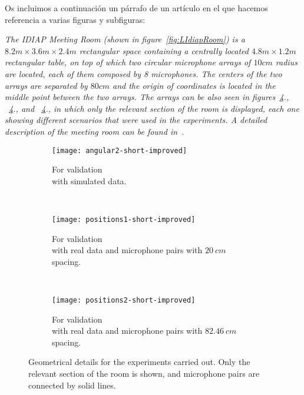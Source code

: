 Os incluimos a continuación un
párrafo de un artículo en el que hacemos referencia a varias figuras y
subfiguras: 

\emph{The IDIAP Meeting Room (shown in figure~\ref{fig:LIdiapRoom}) is a $8.2m
\times 3.6m \times 2.4m$ rectangular space containing a centrally
located $4.8m \times 1.2m$ rectangular table, on top of which two
circular microphone arrays of $10 cm$ radius are located, each of them
composed by 8 microphones. The centers of the two arrays are separated
by $80 cm$ and the origin of coordinates is located in the middle point
between the two arrays. The arrays can be also seen in
figures~\ref{fig:simureal_positions}.,
~\ref{fig:simureal_positions}., and
~\ref{fig:simureal_positions}., in which
only the relevant section of the room is displayed, each one showing
different scenarios that were used in the experiments. A detailed
description of the meeting room can be found in~\cite{moore2002}.}

\begin{figure}
  \centering
  \begin{subfigure}[t]{0.3\textwidth}
    \texttt{[image: angular2-short-improved]}
    \caption{For validation\\with simulated data.}
    \label{fig:Simulated_positions}
  \end{subfigure}
~%
  \begin{subfigure}[t]{0.3\textwidth}
    \texttt{[image: positions1-short-improved]}
    \caption{For validation\\with real data and microphone pairs with $20~cm$ spacing.}
    \label{fig:real_positions_short}
  \end{subfigure}
  ~
  \begin{subfigure}[t]{0.3\textwidth}
    \texttt{[image: positions2-short-improved]}
    \caption{For validation\\with real data and microphone pairs with
      $82.46~cm$ spacing.}
    \label{fig:real_positions_long}
  \end{subfigure}
  \caption{Geometrical details for the experiments carried out. Only the
    relevant section of the room is shown, and microphone pairs are
    connected by solid lines.}
  \label{fig:simureal_positions}
\end{figure}

